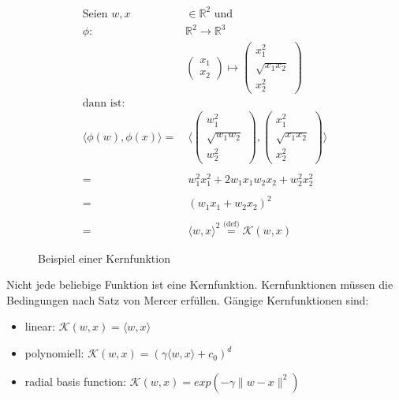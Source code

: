 \renewcommand{\figurename}{Bsp.}
\begin{figure}[htbp]
\begin{equation*}
\label{eq:svm_kernel_example}
\begin{split}
    \text{Seien } w,x & \in \mathbb{R}^2 \text{ und}\\
    \phi : & \mathbb{R}^2 \to \mathbb{R}^3\\
    & \begin{pmatrix}
    x_1 \\
    x_2
    \end{pmatrix}
    \mapsto
    \begin{pmatrix}
    x_1^2 \\
    \sqrt{x_1x_2} \\
    x_2^2
    \end{pmatrix}\\
    \text{dann ist:} &\\
    \langle \phi(w),\phi(x) \rangle = & \:\langle \begin{pmatrix}
    w_1^2 \\
    \sqrt{w_1w_2} \\
    w_2^2
    \end{pmatrix},
    \begin{pmatrix}
    x_1^2 \\
    \sqrt{x_1x_2} \\
    x_2^2
    \end{pmatrix} \rangle \\
    \\
    = & \:w_1^2x_1^2 + 2 w_1x_1w_2x_2 + w_2^2x_2^2 \\
    \\
    = & \:(w_1x_1 + w_2x_2)^2 \\
    \\
    = & \:\langle w,x \rangle^2 \overset{\text{(def)}}= \mathcal{K}(w,x)
\end{split}
\end{equation*}
    \caption{Beispiel einer Kernfunktion}
    \label{fig:ex_kernel}
\end{figure}
\renewcommand{\figurename}{Abb.}

Nicht jede beliebige Funktion ist eine Kernfunktion. Kernfunktionen müssen die Bedingungen nach Satz von Mercer \cite[S. 127]{Marsland} erfüllen. 
Gängige Kernfunktionen sind:
\begin{itemize}
\item{linear: $\mathcal{K}(w,x) = \langle w,x \rangle$}
\item{polynomiell: $\mathcal{K}(w,x) = (\gamma\langle w,x \rangle+c_0)^d$}
\item{radial basis function: $\mathcal{K}(w,x) = exp(- \gamma \|w - x \| ^2)$}
\end{itemize}


